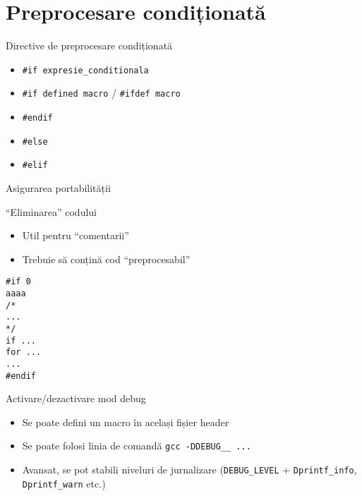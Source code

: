 \documentclass{beamer}
\begin{document}
\section{Preprocesare condiționată}

\frame{\tableofcontents[currentsection]}

\begin{frame}{Directive de preprocesare condiționată}
	\begin{itemize}
		\item \texttt{\#if expresie\_conditionala}
		\item \texttt{\#if defined macro} / \texttt{\#ifdef macro}
		\item \texttt{\#endif}
		\item \texttt{\#else}
		\item \texttt{\#elif}
	\end{itemize}
\end{frame}

\begin{frame}{Asigurarea portabilității}
	
\end{frame}

\begin{frame}{``Eliminarea'' codului}
	\begin{itemize}
		\item Util pentru ``comentarii''
		\item Trebuie să conțină cod ``preprocesabil''
	\end{itemize}

	\begin{beamerboxesrounded}[lower=block body,shadow=true]{}
\texttt{\#if 0 \\
\hlstd{}\hlstd{\ \ \ \ \ \ \ \ }\hlstd{}aaaa \\
\hlstd{}\hlstd{\ \ \ \ \ \ \ \ }\hlstd{}/*  \\
\hlstd{}\hlstd{\ \ \ \ \ \ \ \ }\hlstd{}... \\
\hlstd{}\hlstd{\ \ \ \ \ \ \ \ }\hlstd{}*/ \\
\hlstd{}\hlstd{\ \ \ \ \ \ \ \ }\hlstd{}if ...\\
\hlstd{}\hlstd{\ \ \ \ \ \ \ \ }\hlstd{}for ...\\
\hlstd{}\hlstd{\ \ \ \ \ \ \ \ }\hlstd{}... \\
\#endif
}
	\end{beamerboxesrounded}

\end{frame}

\begin{frame}{Activare/dezactivare mod debug}
	
	\begin{itemize}
		\item Se poate defini un macro în același fișier header
		\item Se poate folosi linia de comandă \texttt{gcc -DDEBUG\_\_ ...}
		\item Avansat, se pot stabili niveluri de jurnalizare
(\texttt{DEBUG\_LEVEL} + \texttt{Dprintf\_info}, \texttt{Dprintf\_warn} etc.)
	\end{itemize}
\end{frame}
\end{document}
